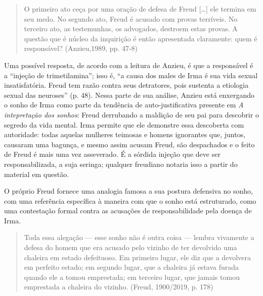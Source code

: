 \begin{quote}
O primeiro ato ceça por uma oração de defesa de Freud {[}\ldots{}{]} ele
termina em seu medo. No segundo ato, Freud é acusado com provas
terríveis. No terceiro ato, as testemunhas, os advogados, destroem estas
provas. A questão que é núcleo da inquirição é então apresentada
claramente: quem é responsável? (Anzieu,1989, pp. 47-8)
\end{quote}

Uma possível resposta, de acordo com a leitura de Anzieu, é que a
responsável é a ``injeção de trimetilamina''; isso é, ``a causa dos
males de Irma é sua vida sexual insatisfatória. Freud tem razão contra
seus detratores, pois sustenta a etiologia sexual das neuroses'' (p.
48). Nessa parte de sua análise, Anzieu está enxergando o sonho de Irma
como parte da tendência de auto-justificativa presente em \emph{A
intepretação dos sonhos}: Freud derrubando a maldição de seu pai para
descobrir o segredo da vida mental. Irma permite que ele demonstre essa
descoberta com autoridade: todas aquelas mulheres teimosas e homens
ignorantes que, juntos, causaram uma bagunça, e mesmo assim acusam
Freud, são despachados e o feito de Freud é mais uma vez asseverado. É a
sórdida injeção que deve ser responsabilizada, a suja seringa; qualquer
freudiano notaria isso a partir do material em questão.

O próprio Freud fornece uma analogia famosa a sua postura defensiva no
sonho, com uma referência específica à maneira com que o sonho está
estruturado, como uma contestação formal contra as acusações de
responsabilidade pela doença de Irma.

\begin{quote}
Toda essa alegação --- esse sonho não é outra coisa --- lembra vivamente a
defesa do homem que era acusado pelo vizinho de ter devolvido uma
chaleira em estado defeituoso. Em primeiro lugar, ele diz que a
devolvera em perfeito estado; em segundo lugar, que a chaleira já estava
furada quando ele a tomou emprestada; em terceiro lugar, que jamais
tomou emprestada a chaleira do vizinho. (Freud, 1900/2019, p. 178)
\end{quote}


